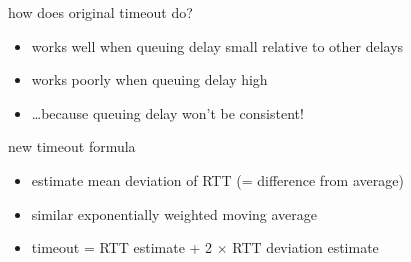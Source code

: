 \begin{frame}{how does original timeout do?}
    \begin{itemize}
    \item works well when queuing delay small relative to other delays
    \item works poorly when queuing delay high
    \item \ldots because queuing delay won't be consistent!
    \end{itemize}
\end{frame}

\begin{frame}{new timeout formula}
    \begin{itemize}
    \item estimate mean deviation of RTT (= difference from average)
    \item similar exponentially weighted moving average
    \vspace{.5cm}
    \item timeout = RTT estimate + 2 $\times$ RTT deviation estimate
    \end{itemize}
\end{frame}


